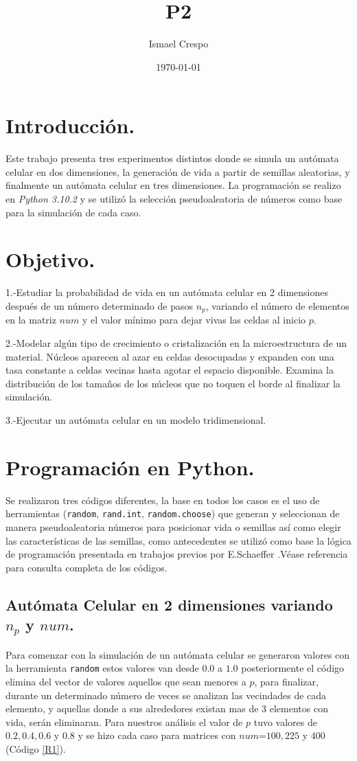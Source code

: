 \documentclass{article}
\title{P2}
\author{Ismael Crespo}
\date{\today}
\begin{document}
\maketitle

\section{Introducción.}
Este trabajo presenta tres experimentos distintos donde se simula un autómata celular en dos dimensiones, la generación de vida a partir de semillas aleatorias, y finalmente un autómata celular en tres dimensiones. La programación se realizo en \emph{Python 3.10.2} y se utilizó la selección pseudoaleatoria de números como base para la simulación de cada caso.
\section{Objetivo.}
1.-Estudiar la probabilidad de vida en un autómata celular en 2 dimensiones después de un número determinado de pasos $n_p$, variando el número de elementos en la matriz $num$ y el valor mínimo para dejar vivas las celdas al inicio $p$.

2.-Modelar algún tipo de crecimiento o cristalización en la microestructura de un material. Núcleos aparecen al azar en celdas desocupadas y expanden con una tasa constante a celdas vecinas hasta agotar el espacio disponible. Examina la distribución de los tamaños de los núcleos que no toquen el borde al finalizar la simulación.

3.-Ejecutar un autómata celular en un modelo tridimensional.
 
\section{Programación en Python.}
Se realizaron tres códigos diferentes, la base en todos los casos es el uso de herramientas (\texttt{random}, \texttt{rand.int}, \texttt{random.choose}) que generan y seleccionan de manera pseudoaleatoria números para posicionar vida o semillas así como elegir las características de las semillas, como antecedentes se utilizó como base la lógica de programación presentada en trabajos previos por E.Schaeffer \citep{E.Schaeffer}.Véase referencia \citep{REPOP2} para consulta completa de los códigos.
\subsection {Autómata Celular en 2 dimensiones variando $n_p$ y $num$.}
Para comenzar con la simulación de un autómata celular se generaron valores con la herramienta \texttt{random} estos valores van desde $0.0$ a $1.0$ posteriormente el código elimina del vector de valores aquellos que sean menores a $p$, para finalizar, durante un determinado número de veces se analizan las vecindades de cada elemento, y aquellas donde a sus alrededores existan mas de 3 elementos con vida, serán eliminaran. Para nuestros análisis el valor de $p$  tuvo valores de $0.2, 0.4, 0.6$ y $0.8$ y se hizo cada caso para matrices con $num$=$100, 225$ y $400$ (Código \ref{R1}).
\end{document}
